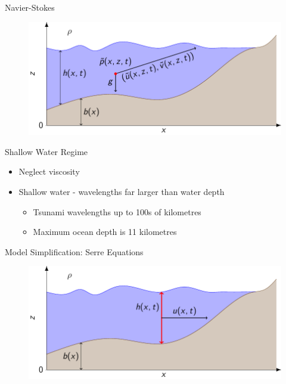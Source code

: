 \documentclass[pdf]{beamer}
\begin{document}
\begin{frame}{Navier-Stokes }
	\begin{figure}
		\includegraphics[width=\textwidth]{./Pics/Tex/WaterModel/NavierStokes.pdf}
	\end{figure}
\end{frame}

\begin{frame}{Shallow Water Regime}
	\begin{itemize}
		\pause
		\item Neglect viscosity
		\pause
		\item Shallow water - wavelengths far larger than water depth 
		\pause
		\begin{itemize}
		\item Tsunami wavelengths up to 100s of kilometres
		\item Maximum ocean depth is 11 kilometres
		\end{itemize}
	\end{itemize}
\end{frame}

\begin{frame}{Model Simplification: Serre Equations }
	\begin{figure}
		\includegraphics[width=\textwidth]{./Pics/Tex/WaterModel/Serre.pdf}
	\end{figure}
\end{frame}
\end{document}
